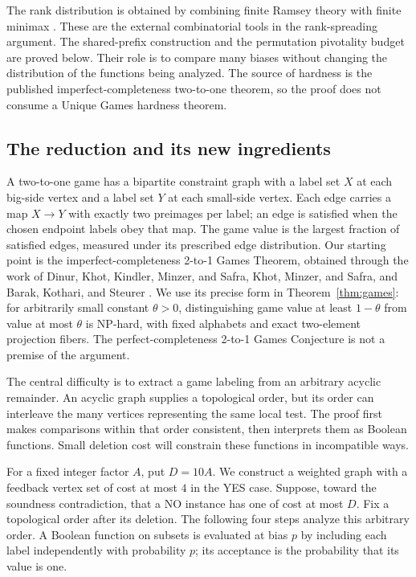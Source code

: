 The rank distribution is obtained by combining finite Ramsey theory
\cite{Ramsey1930} with finite minimax \cite{vonNeumann1928}.
These are the external combinatorial tools in the rank-spreading
argument. The shared-prefix construction and the permutation
pivotality budget are proved below. Their role is to compare many
biases without changing the distribution of the functions being
analyzed. The source of hardness is the published imperfect-completeness
two-to-one theorem, so the proof does not consume a Unique Games
hardness theorem.

\subsection{The reduction and its new ingredients}

A two-to-one game has a bipartite constraint graph with a label set
$X$ at each big-side vertex and a label set $Y$ at each small-side
vertex. Each edge carries a map $X\to Y$ with exactly two preimages
per label; an edge is satisfied when the chosen endpoint labels obey
that map. The game value is the largest fraction of satisfied edges,
measured under its prescribed edge distribution.
Our starting point is the imperfect-completeness 2-to-1 Games Theorem,
obtained through the work of Dinur, Khot, Kindler, Minzer, and Safra,
Khot, Minzer, and Safra, and Barak, Kothari, and Steurer
\cite{DKKMS2025,KMS2018,BKS2019}. We use its precise form in
Theorem~\ref{thm:games}: for arbitrarily small constant $\theta>0$,
distinguishing game value at least $1-\theta$ from value at most
$\theta$ is NP-hard, with fixed alphabets and exact two-element
projection fibers. The perfect-completeness 2-to-1 Games Conjecture
is not a premise of the argument.

The central difficulty is to extract a game labeling from an arbitrary
acyclic remainder. An acyclic graph supplies a topological order, but
its order can interleave the many vertices representing the same local
test. The proof first makes comparisons within that order consistent,
then interprets them as Boolean functions. Small deletion cost will
constrain these functions in incompatible ways.

For a fixed integer factor $A$, put $D=10A$. We construct a weighted
graph with a feedback vertex set of cost at most $4$ in the YES case.
Suppose, toward the soundness contradiction, that a NO instance has
one of cost at most $D$. Fix a topological order after its deletion.
The following four steps analyze this arbitrary order. A Boolean
function on subsets is evaluated at bias $p$ by including each label
independently with probability $p$; its acceptance is the probability
that its value is one.

